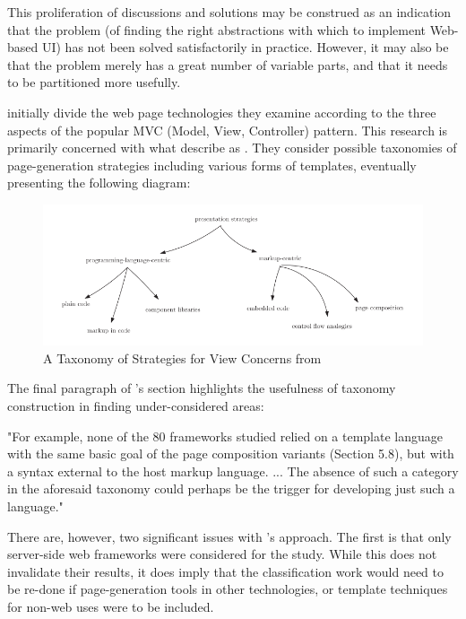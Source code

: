\begin{displayquote}
This proliferation of discussions and solutions may be construed as an indication that the problem (of finding the right abstractions with which to implement Web-based UI) has not been solved satisfactorily in practice. However, it may also be that the problem merely has a great number of variable parts, and that it needs to be partitioned more usefully. \citep{Vosloo2008}
\end{displayquote}

\cite{Vosloo2008} initially divide the web page technologies they examine according to the three aspects of the popular MVC (Model, View, Controller) pattern. This research is primarily concerned with what \citeauthor{Vosloo2008} describe as . They consider possible taxonomies of page-generation strategies including various forms of templates, eventually presenting the following diagram:

\begin{figure}[ht!]
\centering
\includegraphics[width=130mm]{Figures/taxonomy.png}
\caption{A Taxonomy of Strategies for View Concerns from \cite{Vosloo2008}}
\end{figure}

The final paragraph of \citeauthor{Vosloo2008}'s  section highlights the usefulness of taxonomy construction in finding under-considered areas:

\begin{displayquote}
"For example, none of the 80 frameworks studied relied on a template language with the same basic goal of the page composition variants (Section 5.8), but with a syntax external to the host markup language. ... The absence of such a category in the aforesaid taxonomy could perhaps be the trigger for developing just such a language." \citep{Vosloo2008}
\end{displayquote}

There are, however, two significant issues with \citeauthor{Vosloo2008}'s approach. The first is that only server-side web frameworks were considered for the study. While this does not invalidate their results, it does imply that the classification work would need to be re-done if page-generation tools in other technologies, or template techniques for non-web uses were to be included.

